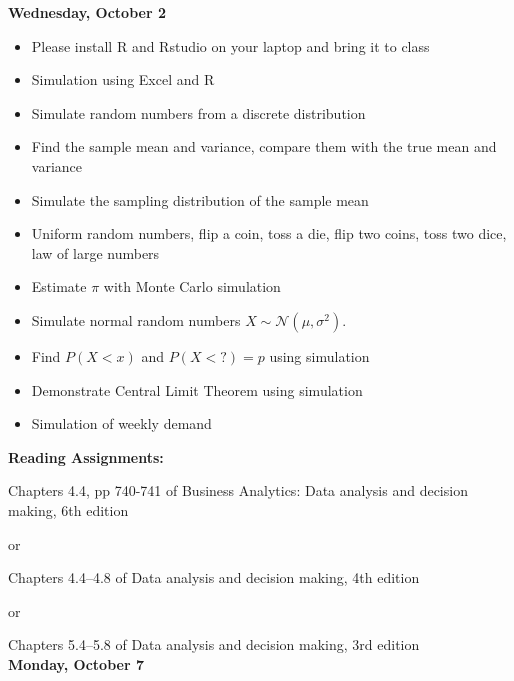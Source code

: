 \documentclass[11pt]{article}
\begin{document}
\vspace{5mm}
\noindent\textbf{\large Wednesday, October 2} 
\begin{itemize}
\item Please install R and Rstudio on your laptop and bring it to class
\item Simulation using Excel and R
\item Simulate random numbers from a discrete distribution
\item Find the sample mean and  variance, compare them with the true mean and variance
\item Simulate the sampling distribution of the sample mean 
\item Uniform random numbers, flip a coin, toss a die, flip two coins, toss two dice, law of large numbers
\item Estimate $\pi$ with Monte Carlo simulation
\item Simulate normal random numbers $X\sim\mathcal{N}(\mu,\sigma^2)$. 
\item Find $P(X<x)$ and $P(X<?)=p$ using simulation
\item Demonstrate Central Limit Theorem using simulation
\item Simulation of weekly demand

\end{itemize}
\noindent\textbf{Reading Assignments:}

Chapters 4.4, %
 pp 740-741 of Business Analytics: Data analysis and decision making, 6th edition

or 

Chapters 4.4--4.8 of Data analysis and decision making, 4th edition

or 

Chapters 5.4--5.8  of  Data analysis and decision making, 3rd edition\\

	
\vspace{5mm}
\noindent\textbf{\large Monday, October 7} 	
\end{document}
